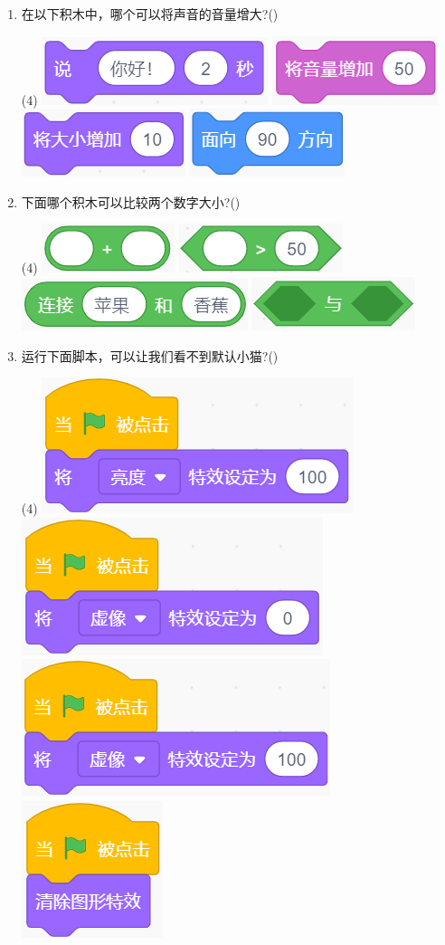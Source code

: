 \documentclass[10pt, a4paper]{article}
\begin{document}
\begin{enumerate}
        \item 在以下积木中，哪个可以将声音的音量增大?(\qquad)
        \begin{tasks}(4)
            \task \includegraphics[width=.15\textwidth]{18a.png}
            \task \includegraphics[width=.12\textwidth]{18b.png}
            \task \includegraphics[width=.12\textwidth]{18c.png}
            \task \includegraphics[width=.12\textwidth]{18d.png}
        \end{tasks}

        \newpage
        \item 下面哪个积木可以比较两个数字大小?(\qquad)
        \begin{tasks}(4)
            \task \includegraphics[width=.1\textwidth]{19a.png}
            \task \includegraphics[width=.12\textwidth]{19b.png}
            \task \includegraphics[width=.15\textwidth]{19c.png}
            \task \includegraphics[width=.12\textwidth]{19d.png}
        \end{tasks}

        \item 运行下面脚本，可以让我们看不到默认小猫?(\qquad)
        \begin{tasks}(4)
            \task \includegraphics[width=.18\textwidth]{20a.png}
            \task \includegraphics[width=.18\textwidth]{20b.png}
            \task \includegraphics[width=.18\textwidth]{20c.png}
            \task \includegraphics[width=.09\textwidth]{20d.png}
        \end{tasks}


\end{enumerate}
\end{document}
